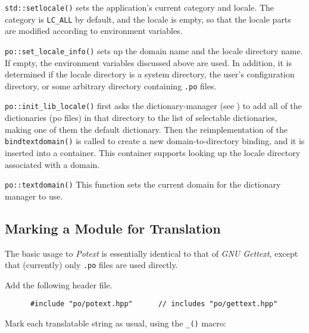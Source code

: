    \begin{enumber}
      \item \texttt{std::setlocale()} sets the application's current
         category and locale.
         The category is \texttt{LC\_ALL} by default, and the locale
         is empty, so that the locale parts are modified according to
         environment variables.
      \item \texttt{po::set\_locale\_info()} sets up the domain name
         and the locale directory name. If empty, the
         environment variables discussed above are used.
         In addition, it is determined if the locale directory
         is a system directory, the user's configuration directory,
         or some arbitrary directory containing \texttt{.po} files.
      \item \texttt{po::init\_lib\_locale()} first
         asks the dictionary-manager (see 
         )
         to add all of the dictionaries (po files) in that directory
         to the list of selectable dictionaries, making one
         of them the default dictionary.
         Then the reimplementation of the \texttt{bindtextdomain()}
         is called to create a new domain-to-directory binding, and
         it is inserted into a container.
         This container supports looking up the locale directory
         associated with a domain.
      \item \texttt{po::textdomain()}
         This function sets the current domain for the dictionary
         manager to use.
   \end{enumber}

\subsection{Marking a Module for Translation}
\label{subsubsec:potext_usage_marking}

   The basic usage to \textsl{Potext} is essentially identical to
   that of \textsl{GNU Gettext}, except that (currently) only
   \texttt{.po} files are used directly.

   Add the following header file.

   \begin{verbatim}
      #include "po/potext.hpp"      // includes "po/gettext.hpp"
   \end{verbatim}

   Mark each translatable string as usual, using the
   \texttt{\_()} macro:

